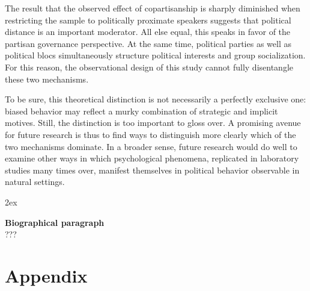 \documentclass[12pt,a4paper]{article}
\begin{document}
The result that the observed effect of copartisanship is sharply diminished when restricting the sample to politically proximate speakers suggests that political distance is an important moderator. All else equal, this speaks in favor of the partisan governance perspective. At the same time, political parties as well as political blocs simultaneously structure political interests and group socialization. For this reason, the observational design of this study cannot fully disentangle these two mechanisms.

To be sure, this theoretical distinction is not necessarily a perfectly exclusive one: biased behavior may reflect a murky combination of strategic and implicit motives. Still, the distinction is too important to gloss over. A promising avenue for future research is thus to find ways to distinguish more clearly which of the two mechanisms dominate. In a broader sense, future research would do well to examine other ways in which psychological phenomena, replicated in laboratory studies many times over, manifest themselves in political behavior observable in natural settings.



\newpage
\begingroup
\parindent 0pt
\parskip 2ex
\def\enotesize{\normalsize}
\theendnotes %
\endgroup

\clearpage






\clearpage

\noindent \textbf{Biographical paragraph} \\
???

\clearpage

\appendix

\section{Appendix}
\end{document}
